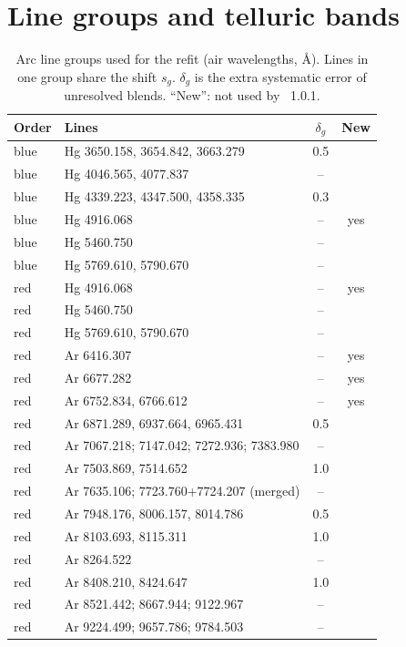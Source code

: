 \section{Line groups and telluric bands}
\label{app:tables}

\begin{table}
\centering
\caption{Arc line groups used for the refit (air wavelengths, \AA). Lines in one group share the shift $s_g$.
$\delta_g$ is the extra systematic error of unresolved blends. ``New'': not used by \banzai{}~1.0.1.}
\label{tab:groups}
\begin{tabular}{llcc}
\toprule
Order & Lines & $\delta_g$ & New \\
\midrule
blue & Hg 3650.158, 3654.842, 3663.279 & 0.5 & \\
blue & Hg 4046.565, 4077.837 & -- & \\
blue & Hg 4339.223, 4347.500, 4358.335 & 0.3 & \\
blue & Hg 4916.068 & -- & yes \\
blue & Hg 5460.750 & -- & \\
blue & Hg 5769.610, 5790.670 & -- & \\
red & Hg 4916.068 & -- & yes \\
red & Hg 5460.750 & -- & \\
red & Hg 5769.610, 5790.670 & -- & \\
red & Ar 6416.307 & -- & yes \\
red & Ar 6677.282 & -- & yes \\
red & Ar 6752.834, 6766.612 & -- & yes \\
red & Ar 6871.289, 6937.664, 6965.431 & 0.5 & \\
red & Ar 7067.218; 7147.042; 7272.936; 7383.980 & -- & \\
red & Ar 7503.869, 7514.652 & 1.0 & \\
red & Ar 7635.106; 7723.760+7724.207 (merged) & -- & \\
red & Ar 7948.176, 8006.157, 8014.786 & 0.5 & \\
red & Ar 8103.693, 8115.311 & 1.0 & \\
red & Ar 8264.522 & -- & \\
red & Ar 8408.210, 8424.647 & 1.0 & \\
red & Ar 8521.442; 8667.944; 9122.967 & -- & \\
red & Ar 9224.499; 9657.786; 9784.503 & -- & \\
\bottomrule
\end{tabular}
\end{table}

